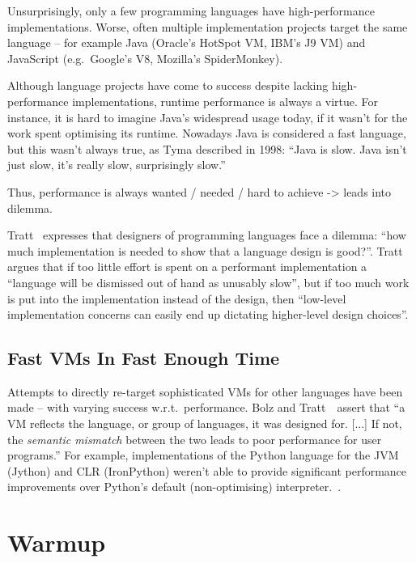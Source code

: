 Unsurprisingly, only a few programming languages have high-performance
implementations. Worse, often multiple implementation projects
target the same language -- for example Java (Oracle's HotSpot VM, IBM's
J9 VM) and JavaScript (e.g.~Google's V8, Mozilla's SpiderMonkey).

Although language projects have come to success despite lacking high-performance
implementations, runtime performance is always a virtue. For instance, it is
hard to imagine Java's widespread usage today, if it wasn't for the work spent
optimising its runtime. Nowadays Java is considered a fast language, but this
wasn't always true, as Tyma described in 1998: ``Java is slow. Java isn't just
slow, it's really slow, surprisingly slow.''~\cite{tyma1998we}

Thus, performance is always wanted / needed / hard to achieve -> leads into dilemma.

Tratt~\cite{tratt_fast_enough} expresses that designers of programming languages
face a dilemma: ``how much implementation is needed to show that a language
design is good?''. Tratt argues that if too little effort is spent on a
performant implementation a ``language will be dismissed out of hand as unusably
slow'', but if too much work is put into the implementation instead of the
design, then ``low-level implementation concerns can easily end up dictating
higher-level design choices''.

\subsection{Fast VMs In Fast Enough Time}

Attempts to directly re-target sophisticated VMs for other languages have been
made -- with varying success w.r.t.~performance. Bolz and
Tratt~\cite{bolz14impact}~assert that ``a VM reflects the language, or group of
languages, it was designed for. [...] If not, the \emph{semantic mismatch}
between the two leads to poor performance for user programs.'' For example,
implementations of the Python language for the JVM (Jython) and CLR (IronPython)
weren't able to provide significant performance improvements over Python's
default (non-optimising) interpreter.~\cite{bolz14impact}.


\section{Warmup}

